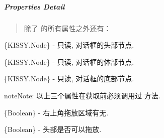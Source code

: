 \documentclass[letterpaper,10pt,english]{sphinxmanual}
\begin{document}
\subparagraph{Properties Detail}
\label{api/component/overlay/dialog:properties-detail}\begin{quote}

除了 {\hyperref[api/component/overlay/popup:module-Overlay]{}} 的所有属性之外还有：
\end{quote}


\begin{fulllineitems}
\label{api/component/overlay/dialog:Overlay.header}
\{KISSY.Node\} - 只读, 对话框的头部节点.

\end{fulllineitems}



\begin{fulllineitems}
\label{api/component/overlay/dialog:Overlay.body}
\{KISSY.Node\} - 只读, 对话框的体部节点.

\end{fulllineitems}



\begin{fulllineitems}
\label{api/component/overlay/dialog:Overlay.footer}
\{KISSY.Node\} - 只读, 对话框的底部节点.

\begin{notice}{note}{Note:}
以上三个属性在获取前必须调用过  方法.
\end{notice}

\end{fulllineitems}



\begin{fulllineitems}
\{Boolean\} - 右上角拖放区域有无.

\end{fulllineitems}



\begin{fulllineitems}
\{Boolean\} - 头部是否可以拖放.

\end{fulllineitems}
\end{document}
